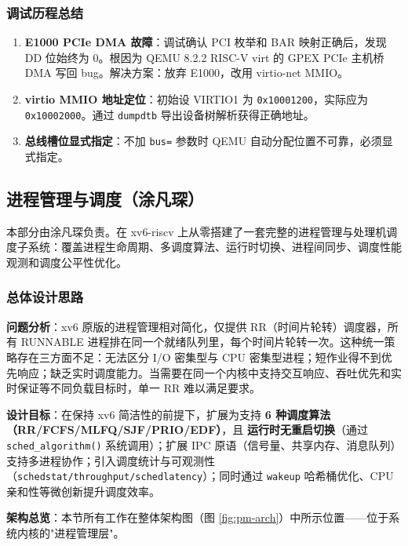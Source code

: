 \documentclass[12pt,a4paper]{ctexart}
\begin{document}
\subsubsection{调试历程总结}

\begin{enumerate}
  \item \textbf{E1000 PCIe DMA 故障}：调试确认 PCI 枚举和 BAR 映射正确后，发现 DD 位始终为 0。根因为 QEMU 8.2.2 RISC-V virt 的 GPEX PCIe 主机桥 DMA 写回 bug。解决方案：放弃 E1000，改用 virtio-net MMIO。
  \item \textbf{virtio MMIO 地址定位}：初始设 VIRTIO1 为 \texttt{0x10001200}，实际应为 \texttt{0x10002000}。通过 \texttt{dumpdtb} 导出设备树解析获得正确地址。
  \item \textbf{总线槽位显式指定}：不加 \texttt{bus=} 参数时 QEMU 自动分配位置不可靠，必须显式指定。
\end{enumerate}

\subsection{进程管理与调度（涂凡琛）}

本部分由涂凡琛负责。在 xv6-riscv 上从零搭建了一套完整的进程管理与处理机调度子系统：覆盖进程生命周期、多调度算法、运行时切换、进程间同步、调度性能观测和调度公平性优化。

\subsubsection{总体设计思路}

\textbf{问题分析}：xv6 原版的进程管理相对简化，仅提供 RR（时间片轮转）调度器，所有 RUNNABLE 进程排在同一个就绪队列里，每个时间片轮转一次。这种统一策略存在三方面不足：无法区分 I/O 密集型与 CPU 密集型进程；短作业得不到优先响应；缺乏实时调度能力。当需要在同一个内核中支持交互响应、吞吐优先和实时保证等不同负载目标时，单一 RR 难以满足要求。

\textbf{设计目标}：在保持 xv6 简洁性的前提下，扩展为支持 \textbf{6 种调度算法（RR/FCFS/MLFQ/SJF/PRIO/EDF）}，且 \textbf{运行时无重启切换}（通过 \texttt{sched\_algorithm()} 系统调用）；扩展 IPC 原语（信号量、共享内存、消息队列）支持多进程协作；引入调度统计与可观测性（\texttt{schedstat/throughput/schedlatency}）；同时通过 \texttt{wakeup} 哈希桶优化、CPU 亲和性等微创新提升调度效率。

\textbf{架构总览}：本节所有工作在整体架构图（图 \ref{fig:pm-arch}）中所示位置——位于系统内核的"进程管理层"。
\end{document}

